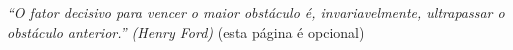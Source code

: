 %
%

\begin{epigrafe}

\textit{``O fator decisivo para vencer o maior obstáculo é, invariavelmente, ultrapassar o obstáculo anterior.'' (Henry Ford)}
(esta página é opcional)

\end{epigrafe}
